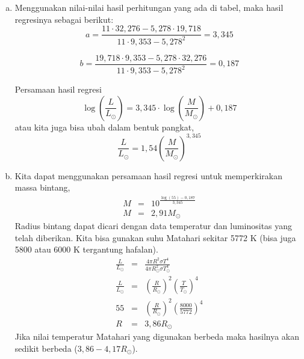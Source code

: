 \documentclass[11pt,fleqn]{exam}
\begin{document}
\begin{questions}
\begin{enumerate}[a.]
    \item Menggunakan nilai-nilai hasil perhitungan yang ada di tabel, maka hasil regresinya sebagai berikut:
    \begin{equation*}
        a  = \frac{11 \cdot 32,276 - 5,278 \cdot 19,718}{11 \cdot 9,353 - 5,278^2} = 3,345
    \end{equation*}
    
    \begin{equation*}
        b = \frac{19,718 \cdot 9,353 - 5,278 \cdot 32,276}{11 \cdot 9,353 - 5,278^2} = 0,187
    \end{equation*}

    Persamaan hasil regresi 
    \begin{equation*}
    \log{\left( \frac{L}{L_\odot} \right)} = 3,345 \cdot \log{\left( \frac{M}{M_\odot} \right)} + 0,187  
    \end{equation*}
    atau kita juga bisa ubah dalam bentuk pangkat,
    \begin{equation*}
         \frac{L}{L_\odot}  = 1,54 \left( \frac{M}{M_\odot} \right)^{3,345}
    \end{equation*}

    \item Kita dapat menggunakan persamaan hasil regresi untuk memperkirakan massa bintang,
    \begin{eqnarray*}
        M &=& 10^{\frac{\log{(55)} - 0,187}{3,345}}\\
        M &=& 2,91 M_\odot
    \end{eqnarray*}
    Radius bintang dapat dicari dengan data temperatur dan luminositas yang telah diberikan. Kita bisa gunakan suhu Matahari sekitar 5772 K (bisa juga 5800 atau 6000 K tergantung hafalan).
    \begin{eqnarray*}
        \frac{L}{L_\odot} &=& \frac{4 \pi R^2 \sigma T^4}{4 \pi R_{\odot}^2 \sigma T_{\odot}^4}\\
        \frac{L}{L_\odot} &=& \left( \frac{R}{R_\odot} \right)^2 \left( \frac{T}{T_\odot} \right)^4\\
        55 &=& \left( \frac{R}{R_\odot} \right)^2 \left( \frac{8000}{5772} \right)^4\\ 
        R &=& 3,86 R_\odot 
    \end{eqnarray*}
    Jika nilai temperatur Matahari yang digunakan berbeda maka hasilnya akan sedikit berbeda ($3,86-4,17 R_\odot$). 
    

\end{enumerate}
\end{questions}
\end{document}
